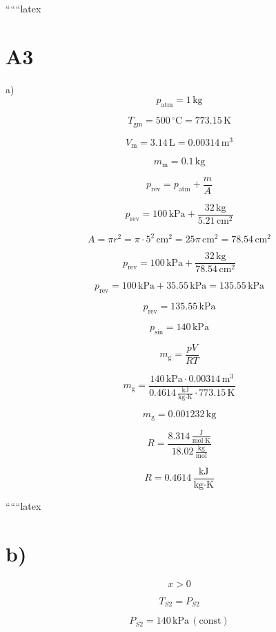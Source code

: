 
``````latex


\section*{A3}

a) \\
\[
p_{\text{atm}} = 1 \, \text{kg}
\]

\[
T_{\text{gm}} = 500 \, ^\circ \text{C} = 773.15 \, \text{K}
\]

\[
V_{\text{m}} = 3.14 \, \text{L} = 0.00314 \, \text{m}^3
\]

\[
m_{\text{m}} = 0.1 \, \text{kg}
\]

\[
p_{\text{rev}} = p_{\text{atm}} + \frac{m}{A}
\]

\[
p_{\text{rev}} = 100 \, \text{kPa} + \frac{32 \, \text{kg}}{5.21 \, \text{cm}^2}
\]

\[
A = \pi r^2 = \pi \cdot 5^2 \, \text{cm}^2 = 25 \pi \, \text{cm}^2 = 78.54 \, \text{cm}^2
\]

\[
p_{\text{rev}} = 100 \, \text{kPa} + \frac{32 \, \text{kg}}{78.54 \, \text{cm}^2}
\]

\[
p_{\text{rev}} = 100 \, \text{kPa} + 35.55 \, \text{kPa} = 135.55 \, \text{kPa}
\]

\[
p_{\text{rev}} = 135.55 \, \text{kPa}
\]

\[
p_{\text{sin}} = 140 \, \text{kPa}
\]

\[
m_{\text{g}} = \frac{pV}{RT}
\]

\[
m_{\text{g}} = \frac{140 \, \text{kPa} \cdot 0.00314 \, \text{m}^3}{0.4614 \, \frac{\text{kJ}}{\text{kg} \cdot \text{K}} \cdot 773.15 \, \text{K}}
\]

\[
m_{\text{g}} = 0.001232 \, \text{kg}
\]

\[
R = \frac{8.314 \, \frac{\text{J}}{\text{mol} \cdot \text{K}}}{18.02 \, \frac{\text{kg}}{\text{mol}}}
\]

\[
R = 0.4614 \, \frac{\text{kJ}}{\text{kg} \cdot \text{K}}
\]

``````latex


\section*{b)}

\[ x > 0 \]

\[ T_{S2} = P_{S2} \]

\[ P_{S2} = 140 \, \text{kPa} \, (\text{const}) \]

\noindent
{}

